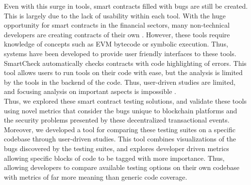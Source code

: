 Even with this surge in tools, smart contracts filled with bugs are still be created. This is largely due to the lack of usability within each tool. With the huge opportunity for smart contracts in the financial sectors, many non-technical developers are creating contracts of their own \cite{tapscott2016blockchain}. However, these tools require knowledge of concepts such as EVM bytecode or symbolic execution. Thus, systems have been developed to provide user friendly interfaces to these tools. SmartCheck automatically checks contracts with code highlighting of errors. This tool allows users to run tools on their code with ease, but the analysis is limited by the tools in the backend of the code. Thus, user-driven studies are limited, and focusing analysis on important aspects is impossible \cite{smartcheck}. \\

Thus, we explored these smart contract testing solutions, and validate these tools using novel metrics that consider the bugs unique to blockchain platforms and the security problems presented by these decentralized transactional events. Moreover, we developed a tool for comparing these testing suites on a specific codebase through user-driven studies. This tool combines visualizations of the bugs discovered by the testing suites, and explores developer driven metrics allowing specific blocks of code to be tagged with more importance. Thus, allowing developers to compare available testing options on their own codebase with metrics of far more meaning than generic code coverage. \\



